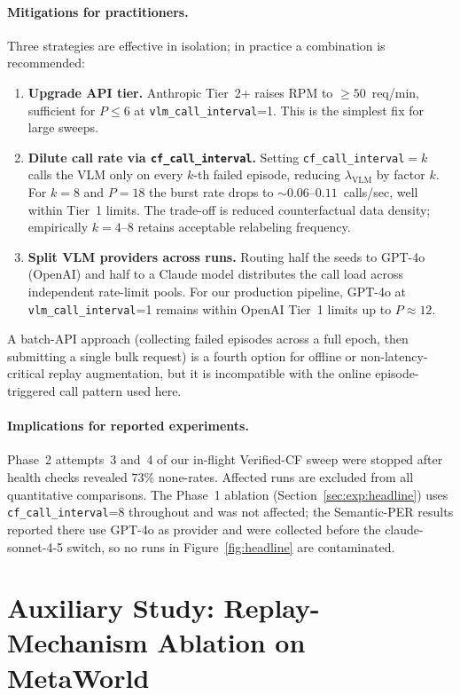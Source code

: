 \paragraph{Mitigations for practitioners.}
Three strategies are effective in isolation; in practice a combination
is recommended:
\begin{enumerate}\itemsep0pt
  \item \textbf{Upgrade API tier.}  Anthropic Tier~2+ raises RPM
    to $\geq 50$~req/min, sufficient for $P \leq 6$ at
    \texttt{vlm\_call\_interval}=1. This is the simplest fix for
    large sweeps.
  \item \textbf{Dilute call rate via \texttt{cf\_call\_interval}.}
    Setting \texttt{cf\_call\_interval}$= k$ calls the VLM only on
    every $k$-th failed episode, reducing $\lambda_{\text{VLM}}$ by
    factor $k$.  For $k=8$ and $P=18$ the burst rate drops to
    $\sim 0.06$--$0.11$~calls/sec, well within Tier~1 limits.
    The trade-off is reduced counterfactual data density; empirically
    $k=4$--$8$ retains acceptable relabeling frequency.
  \item \textbf{Split VLM providers across runs.}  Routing half the
    seeds to GPT-4o (OpenAI) and half to a Claude model distributes
    the call load across independent rate-limit pools.  For our
    production pipeline, GPT-4o at \texttt{vlm\_call\_interval}=1
    remains within OpenAI Tier~1 limits up to $P \approx 12$.
\end{enumerate}
A batch-API approach (collecting failed episodes across a full epoch,
then submitting a single bulk request) is a fourth option for
offline or non-latency-critical replay augmentation, but it is
incompatible with the online episode-triggered call pattern used here.

\paragraph{Implications for reported experiments.}
Phase~2 attempts~3 and~4 of our in-flight Verified-CF sweep were
stopped after health checks revealed $73$\% none-rates.  Affected
runs are excluded from all quantitative comparisons.  The Phase~1
ablation (Section~\ref{sec:exp:headline}) uses \texttt{cf\_call\_interval}=8
throughout and was not affected; the Semantic-PER results reported there
use GPT-4o as provider and were collected before the claude-sonnet-4-5
switch, so no runs in Figure~\ref{fig:headline} are contaminated.

\section{Auxiliary Study: Replay-Mechanism Ablation on MetaWorld}
\label{app:metaworld}

